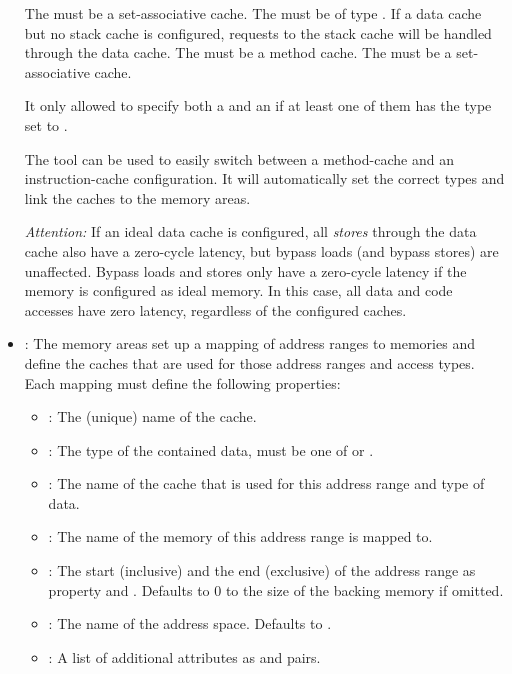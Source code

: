 \begin{itemize}
\begin{framed}
    The  must be a set-associative cache.
    The  must be of type . If a data cache but no stack cache is configured,
    requests to the stack cache will be handled through the data cache.
    The  must be a method cache.
    The  must be a set-associative cache.

    It only allowed to specify both a  and an  if at least one of them has
    the type set to .

    The  tool can be used to easily switch between a method-cache and an instruction-cache 
    configuration. It will automatically set the correct types and link the caches to the memory areas. 


    \emph{Attention:} If an ideal data cache is configured, all \emph{stores} through the data cache also have a zero-cycle
    latency, but bypass loads (and bypass stores) are unaffected.
    Bypass loads and stores only have a zero-cycle latency if the  memory is configured as ideal memory. In
    this case, all data and code accesses have zero latency, regardless of the configured caches.
  \end{framed}

\item {}: The memory areas set up a mapping of address ranges to memories
  and define the caches that are used for those address ranges and access types. Each mapping must define the following
  properties:

  \begin{itemize}
  \item {}: The (unique) name of the cache.
  \item {}: The type of the contained data, must be one of  or .
  \item {}: The name of the cache that is used for this address range and type of data.
  \item {}: The name of the memory of this address range is mapped to.
  \item {}: The start (inclusive) and the end (exclusive) of the address range as property  and .
    Defaults to $0$ to the size of the backing memory if omitted.
  \item {}: The name of the address space. Defaults to .
  \item {}: A list of additional attributes as  and  pairs.
  \end{itemize}
  

\end{itemize}
